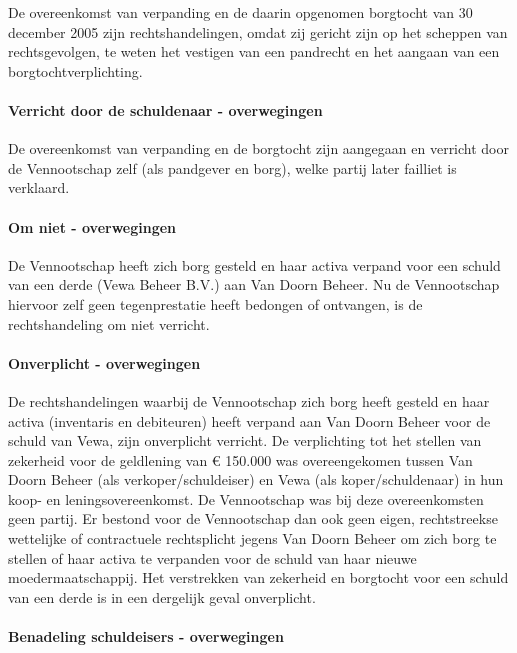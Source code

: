\documentclass[
  dutch,
  a4paper,
]{article}
\begin{document}
De overeenkomst van verpanding en de daarin opgenomen borgtocht van 30 december 2005 zijn rechtshandelingen, omdat zij gericht zijn op het scheppen van rechtsgevolgen, te weten het vestigen van een pandrecht en het aangaan van een borgtochtverplichting.

\paragraph{Verricht door de schuldenaar - overwegingen}\label{verricht-door-de-schuldenaar---overwegingen-2}

De overeenkomst van verpanding en de borgtocht zijn aangegaan en verricht door de Vennootschap zelf (als pandgever en borg), welke partij later failliet is verklaard.

\paragraph{Om niet - overwegingen}\label{om-niet---overwegingen-2}

De Vennootschap heeft zich borg gesteld en haar activa verpand voor een schuld van een derde (Vewa Beheer B.V.) aan Van Doorn Beheer. Nu de Vennootschap hiervoor zelf geen tegenprestatie heeft bedongen of ontvangen, is de rechtshandeling om niet verricht.

\paragraph{Onverplicht - overwegingen}\label{onverplicht---overwegingen-2}

De rechtshandelingen waarbij de Vennootschap zich borg heeft gesteld en haar activa (inventaris en debiteuren) heeft verpand aan Van Doorn Beheer voor de schuld van Vewa, zijn onverplicht verricht. De verplichting tot het stellen van zekerheid voor de geldlening van € 150.000 was overeengekomen tussen Van Doorn Beheer (als verkoper/schuldeiser) en Vewa (als koper/schuldenaar) in hun koop- en leningsovereenkomst. De Vennootschap was bij deze overeenkomsten geen partij. Er bestond voor de Vennootschap dan ook geen eigen, rechtstreekse wettelijke of contractuele rechtsplicht jegens Van Doorn Beheer om zich borg te stellen of haar activa te verpanden voor de schuld van haar nieuwe moedermaatschappij. Het verstrekken van zekerheid en borgtocht voor een schuld van een derde is in een dergelijk geval onverplicht.

\paragraph{Benadeling schuldeisers - overwegingen}\label{benadeling-schuldeisers---overwegingen-2}
\end{document}
